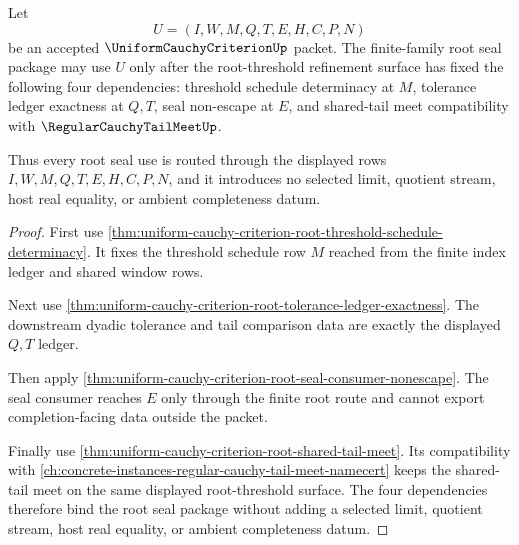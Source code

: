 \begin{theorem}
\label{thm:uniform-cauchy-criterion-root-threshold-dependency-inventory}
Let
$$
U=(I,W,M,Q,T,E,H,C,P,N)
$$
be an accepted $\UniformCauchyCriterionUp$ packet. The finite-family root seal package may use $U$ only after the root-threshold refinement surface has fixed the following four dependencies: threshold schedule determinacy at $M$, tolerance ledger exactness at $Q,T$, seal non-escape at $E$, and shared-tail meet compatibility with $\RegularCauchyTailMeetUp$.

Thus every root seal use is routed through the displayed rows $I,W,M,Q,T,E,H,C,P,N$, and it introduces no selected limit, quotient stream, host real equality, or ambient completeness datum.
\end{theorem}
\begin{proof}
First use \autoref{thm:uniform-cauchy-criterion-root-threshold-schedule-determinacy}. It fixes the threshold schedule row $M$ reached from the finite index ledger and shared window rows.

Next use \autoref{thm:uniform-cauchy-criterion-root-tolerance-ledger-exactness}. The downstream dyadic tolerance and tail comparison data are exactly the displayed $Q,T$ ledger.

Then apply \autoref{thm:uniform-cauchy-criterion-root-seal-consumer-nonescape}. The seal consumer reaches $E$ only through the finite root route and cannot export completion-facing data outside the packet.

Finally use \autoref{thm:uniform-cauchy-criterion-root-shared-tail-meet}. Its compatibility with \autoref{ch:concrete-instances-regular-cauchy-tail-meet-namecert} keeps the shared-tail meet on the same displayed root-threshold surface. The four dependencies therefore bind the root seal package without adding a selected limit, quotient stream, host real equality, or ambient completeness datum.
\end{proof}

